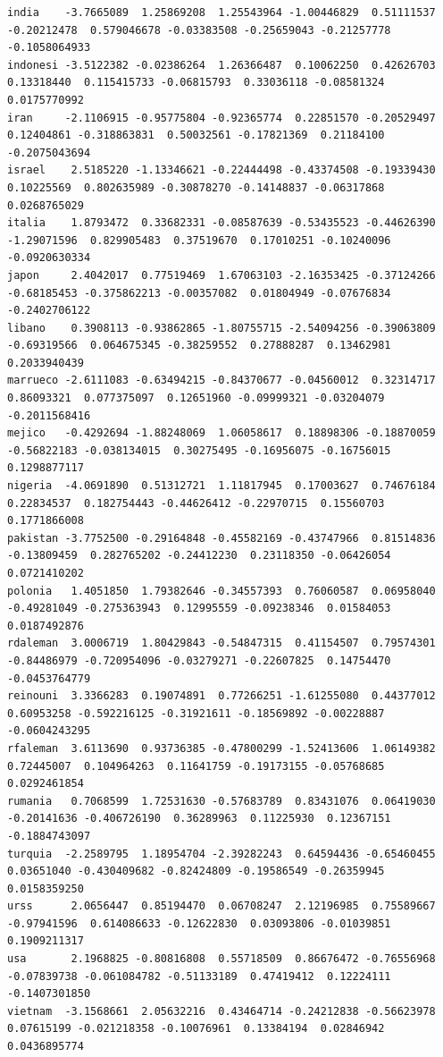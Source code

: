\documentclass[12pt,twoside]{report}
\begin{document}
\begin{verbatim}
india    -3.7665089  1.25869208  1.25543964 -1.00446829  0.51111537 -0.20212478  0.579046678 -0.03383508 -0.25659043 -0.21257778 -0.1058064933
indonesi -3.5122382 -0.02386264  1.26366487  0.10062250  0.42626703  0.13318440  0.115415733 -0.06815793  0.33036118 -0.08581324  0.0175770992
iran     -2.1106915 -0.95775804 -0.92365774  0.22851570 -0.20529497  0.12404861 -0.318863831  0.50032561 -0.17821369  0.21184100 -0.2075043694
israel    2.5185220 -1.13346621 -0.22444498 -0.43374508 -0.19339430  0.10225569  0.802635989 -0.30878270 -0.14148837 -0.06317868  0.0268765029
italia    1.8793472  0.33682331 -0.08587639 -0.53435523 -0.44626390 -1.29071596  0.829905483  0.37519670  0.17010251 -0.10240096 -0.0920630334
japon     2.4042017  0.77519469  1.67063103 -2.16353425 -0.37124266 -0.68185453 -0.375862213 -0.00357082  0.01804949 -0.07676834 -0.2402706122
libano    0.3908113 -0.93862865 -1.80755715 -2.54094256 -0.39063809 -0.69319566  0.064675345 -0.38259552  0.27888287  0.13462981  0.2033940439
marrueco -2.6111083 -0.63494215 -0.84370677 -0.04560012  0.32314717  0.86093321  0.077375097  0.12651960 -0.09999321 -0.03204079 -0.2011568416
mejico   -0.4292694 -1.88248069  1.06058617  0.18898306 -0.18870059 -0.56822183 -0.038134015  0.30275495 -0.16956075 -0.16756015  0.1298877117
nigeria  -4.0691890  0.51312721  1.11817945  0.17003627  0.74676184  0.22834537  0.182754443 -0.44626412 -0.22970715  0.15560703  0.1771866008
pakistan -3.7752500 -0.29164848 -0.45582169 -0.43747966  0.81514836 -0.13809459  0.282765202 -0.24412230  0.23118350 -0.06426054  0.0721410202
polonia   1.4051850  1.79382646 -0.34557393  0.76060587  0.06958040 -0.49281049 -0.275363943  0.12995559 -0.09238346  0.01584053  0.0187492876
rdaleman  3.0006719  1.80429843 -0.54847315  0.41154507  0.79574301 -0.84486979 -0.720954096 -0.03279271 -0.22607825  0.14754470 -0.0453764779
reinouni  3.3366283  0.19074891  0.77266251 -1.61255080  0.44377012  0.60953258 -0.592216125 -0.31921611 -0.18569892 -0.00228887 -0.0604243295
rfaleman  3.6113690  0.93736385 -0.47800299 -1.52413606  1.06149382  0.72445007  0.104964263  0.11641759 -0.19173155 -0.05768685  0.0292461854
rumania   0.7068599  1.72531630 -0.57683789  0.83431076  0.06419030 -0.20141636 -0.406726190  0.36289963  0.11225930  0.12367151 -0.1884743097
turquia  -2.2589795  1.18954704 -2.39282243  0.64594436 -0.65460455  0.03651040 -0.430409682 -0.82424809 -0.19586549 -0.26359945  0.0158359250
urss      2.0656447  0.85194470  0.06708247  2.12196985  0.75589667 -0.97941596  0.614086633 -0.12622830  0.03093806 -0.01039851  0.1909211317
usa       2.1968825 -0.80816808  0.55718509  0.86676472 -0.76556968 -0.07839738 -0.061084782 -0.51133189  0.47419412  0.12224111 -0.1407301850
vietnam  -3.1568661  2.05632216  0.43464714 -0.24212838 -0.56623978  0.07615199 -0.021218358 -0.10076961  0.13384194  0.02846942  0.0436895774
\end{verbatim}
\normalsize
\medskip

\printbibliography[
heading=bibintoc,
title={Referencias}
]
\end{document}

